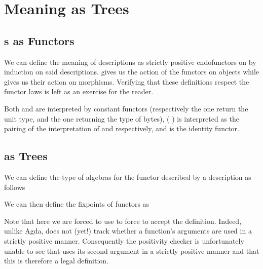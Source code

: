 \section{Meaning as Trees}\label{sec:trees}

\subsection{s as Functors}

We can define the meaning of descriptions as strictly positive
endofunctors on  by induction on said descriptions.
%
 gives us the action of the functors on objects
while  gives us their action on morphisms.
%
Verifying that these definitions respect the functor laws is left as
an exercise for the reader.

Both  and  are interpreted by constant
functors (respectively the one return the unit type, and the one returning
the type of bytes),
%
(  ) is interpreted as the
pairing of the interpretation of  and  respectively,
%
and  is the identity functor.





\subsection{ as Trees}

We can define the type of algebras for the functor described by a
 description as follows


We can then define the fixpoints of functors as



%
Note that here we are forced to use \assertTotal{} to force \idris{}
to accept the definition.
%
Indeed, unlike Agda, \idris{} does not (yet!) track whether a function's
arguments are used in a strictly positive manner.
%
Consequently the positivity checker
is unfortunately unable to see that  uses its second
argument in a strictly positive manner
and that this is therefore a legal definition.

